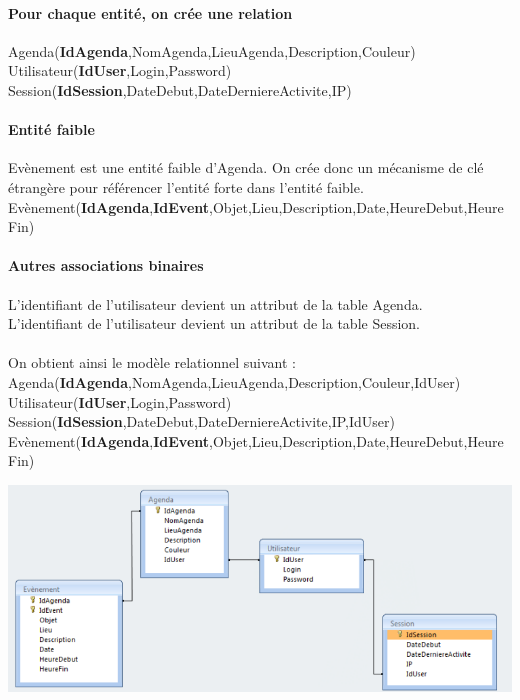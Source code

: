 \documentclass[12pt , a4paper]{article}
\begin{document}
\paragraph{Pour chaque entité, on crée une relation \\}
\noindent Agenda(\textbf{IdAgenda},NomAgenda,LieuAgenda,Description,Couleur)\\
Utilisateur(\textbf{IdUser},Login,Password) \\
Session(\textbf{IdSession},DateDebut,DateDerniereActivite,IP)

\paragraph{Entité faible\\}
\noindent Evènement est une entité faible d'Agenda. On crée donc un mécanisme de clé étrangère pour
référencer l'entité forte dans l'entité faible.\\
Evènement(\textbf{IdAgenda},\textbf{IdEvent},Objet,Lieu,Description,Date,HeureDebut,HeureFin)

\paragraph{Autres associations binaires\\}
\noindent L'identifiant de l'utilisateur devient un attribut de la table Agenda.\\
L'identifiant de l'utilisateur devient un attribut de la table Session.\\ \\

\noindent On obtient ainsi le modèle relationnel suivant :\\
Agenda(\textbf{IdAgenda},NomAgenda,LieuAgenda,Description,Couleur,IdUser)\\
Utilisateur(\textbf{IdUser},Login,Password)\\
Session(\textbf{IdSession},DateDebut,DateDerniereActivite,IP,IdUser)\\
Evènement(\textbf{IdAgenda},\textbf{IdEvent},Objet,Lieu,Description,Date,HeureDebut,HeureFin)\\
\begin{center}
  \includegraphics[scale=0.6]{./images/relationnel.png}
\end{center}
\end{document}
